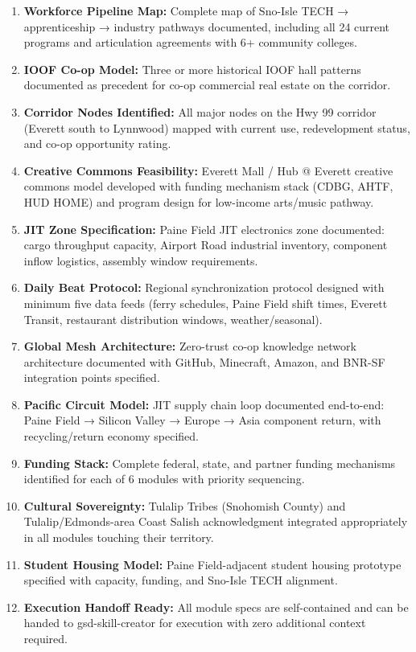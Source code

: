 \documentclass[11pt,letterpaper]{article}
\begin{document}
\begin{enumerate}[leftmargin=*, label=\textbf{SC\arabic*.}]
  \item \textbf{Workforce Pipeline Map:} Complete map of Sno-Isle TECH → apprenticeship → industry pathways documented, including all 24 current programs and articulation agreements with 6+ community colleges.
  \item \textbf{IOOF Co-op Model:} Three or more historical IOOF hall patterns documented as precedent for co-op commercial real estate on the corridor.
  \item \textbf{Corridor Nodes Identified:} All major nodes on the Hwy 99 corridor (Everett south to Lynnwood) mapped with current use, redevelopment status, and co-op opportunity rating.
  \item \textbf{Creative Commons Feasibility:} Everett Mall / Hub @ Everett creative commons model developed with funding mechanism stack (CDBG, AHTF, HUD HOME) and program design for low-income arts/music pathway.
  \item \textbf{JIT Zone Specification:} Paine Field JIT electronics zone documented: cargo throughput capacity, Airport Road industrial inventory, component inflow logistics, assembly window requirements.
  \item \textbf{Daily Beat Protocol:} Regional synchronization protocol designed with minimum five data feeds (ferry schedules, Paine Field shift times, Everett Transit, restaurant distribution windows, weather/seasonal).
  \item \textbf{Global Mesh Architecture:} Zero-trust co-op knowledge network architecture documented with GitHub, Minecraft, Amazon, and BNR-SF integration points specified.
  \item \textbf{Pacific Circuit Model:} JIT supply chain loop documented end-to-end: Paine Field → Silicon Valley → Europe → Asia component return, with recycling/return economy specified.
  \item \textbf{Funding Stack:} Complete federal, state, and partner funding mechanisms identified for each of 6 modules with priority sequencing.
  \item \textbf{Cultural Sovereignty:} Tulalip Tribes (Snohomish County) and Tulalip/Edmonds-area Coast Salish acknowledgment integrated appropriately in all modules touching their territory.
  \item \textbf{Student Housing Model:} Paine Field-adjacent student housing prototype specified with capacity, funding, and Sno-Isle TECH alignment.
  \item \textbf{Execution Handoff Ready:} All module specs are self-contained and can be handed to gsd-skill-creator for execution with zero additional context required.
\end{enumerate}
\end{document}

